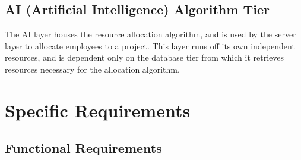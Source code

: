 \documentclass[a4paper,12pt]{article}
\begin{document}
\begin{adjustwidth}{2.5em}{0pt}
		
		\subsection{AI (Artificial Intelligence) Algorithm Tier}
		\begin{flushleft}
			The AI layer houses the resource allocation algorithm, and is used by the server layer to allocate employees to a project. This layer runs off its own independent resources, and is dependent only on the database tier from which it retrieves resources necessary for the allocation algorithm.
			
		\end{flushleft}
	\end{adjustwidth}
	
	\section{Specific Requirements}
	\subsection{Functional Requirements}
\end{document}
